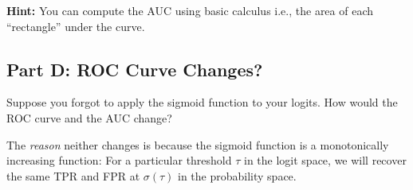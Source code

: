 \documentclass{article}
\begin{document}
\textbf{Hint:} You can compute the AUC using basic calculus i.e., the area of each ``rectangle'' under the curve.

\subsection*{Part D: ROC Curve Changes?}

Suppose you forgot to apply the sigmoid function to your logits.
How would the ROC curve and the AUC change?

The \textit{reason} neither changes is because the sigmoid function is a monotonically increasing function:
For a particular threshold $\tau$ in the logit space, we will recover the same TPR and FPR at $\sigma(\tau)$ in the probability space.

%
\end{document}
